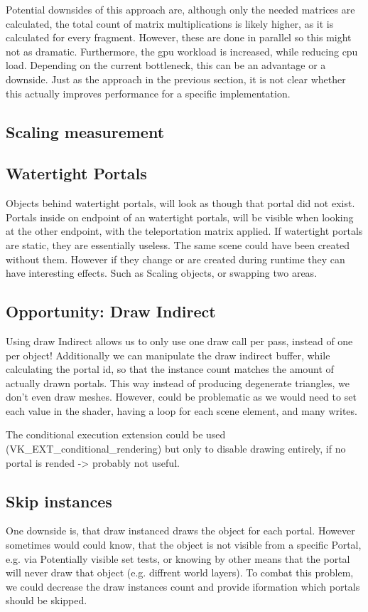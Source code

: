 Potential downsides of this approach are, although only the needed matrices are calculated, the total count of matrix multiplications is likely higher, as it is calculated for every fragment. However, these are done in parallel so this might not as dramatic. Furthermore, the \gls{gpu} workload is increased, while reducing \gls{cpu} load. Depending on the current bottleneck, this can be an advantage or a downside. Just as the approach in the previous section, it is not clear whether this actually improves performance for a specific implementation.
\subsection{Scaling measurement}

\subsection{Watertight Portals}
Objects behind watertight portals, will look as though that portal did not exist. Portals inside on endpoint of an watertight portals, will be visible when looking at the other endpoint, with the teleportation matrix applied. If watertight portals are static, they are essentially useless. The same scene could have been created without them.
However if they change or are created during runtime they can have interesting effects. Such as Scaling objects, or swapping two areas.





\subsection{Opportunity: Draw Indirect}
Using draw Indirect allows us to only use one draw call per pass, instead of one per object!
Additionally we can manipulate the draw indirect buffer, while calculating the portal id, so that the instance count matches the amount of actually drawn portals.
This way instead of producing degenerate triangles, we don't even draw meshes.
However, could be problematic as we would need to set each value in the shader, having a loop for each scene element, and many writes.

The conditional execution extension could be used (VK\_EXT\_conditional\_rendering) but only to disable drawing entirely, if no portal is rended -> probably not useful.

\subsection{Skip instances}
One downside is, that draw instanced draws the object for each portal. However sometimes would could know, that the object is not visible from a specific Portal, e.g. via Potentially visible set tests, or knowing by other means that the portal will never draw that object (e.g. diffrent world layers).
To combat this problem, we could decrease the draw instances count and provide iformation which portals should be skipped.

